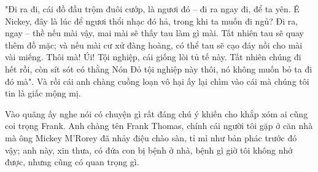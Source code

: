 "Đi ra đi, cái đồ đầu trộm đuôi cướp, là ngươi đó – đi ra ngay đi, để ta yên. Ê Nickey, đây là lúc để ngươi thổi nhạc đó hả, trong khi ta muốn đi ngủ? Đi ra, ngay – thề nếu mài vậy, mai mài sẽ thấy tau làm gì mài. Tất nhiên tau sẽ quay thêm đồ mặc; và nếu mài cư xử đàng hoàng, có thể tau sẽ cạo đáy nồi cho mài vài miếng. Thôi mà! Úi! Tội nghiệp, cái giống lòi tủ tế này. Tất nhiên chúng đi hết rồi, còn sít sót có thằng Nón Đỏ tội nghiệp này thôi, nó không muốn bỏ ta đi đó mà". Và rồi cái anh chàng cuồng loạn vô hại ấy lại chìm vào cái mà chúng tôi tin là giấc mộng mị.

Vào quãng ấy nghe nói có chuyện gì rất đáng chú ý khiến cho khắp xóm ai cũng coi trọng Frank. Anh chàng tên Frank Thomas, chính cái người tôi gặp ở căn nhà mà ông Mickey M'Rorey đã nhảy điệu chào sàn, tỉ mỉ như bản phác trước đó vậy; anh này, xin thưa, có đứa con bị bệnh ở nhà, bệnh gì giờ tôi không nhớ được, nhưng cũng có quan trọng gì. 

